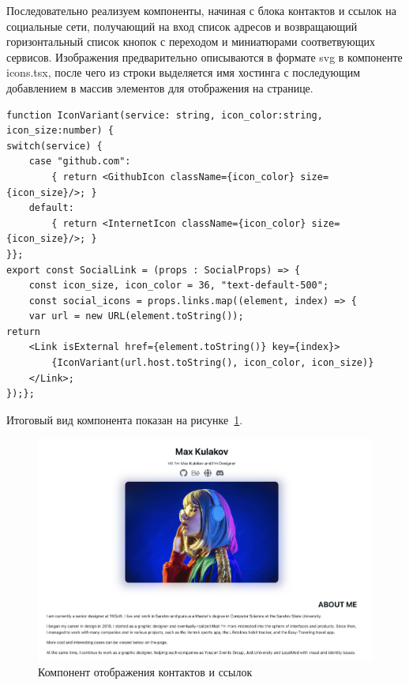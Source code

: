 \documentclass[master, och, pract]{SCWorks}
\begin{document}
Последовательно реализуем компоненты, начиная с блока контактов и ссылок на социальные сети, получающий на вход список адресов и возвращающий горизонтальный список кнопок с переходом и миниатюрами соответвующих сервисов. Изображения предварительно описываются в формате svg в компоненте icons.tsx, после чего из строки выделяется имя хостинга с последующим добавлением в массив элементов для отображения на странице.
\begin{verbatim}
function IconVariant(service: string, icon_color:string, icon_size:number) {
switch(service) { 
    case "github.com": 
        { return <GithubIcon className={icon_color} size={icon_size}/>; } 
    default: 
        { return <InternetIcon className={icon_color} size={icon_size}/>; }
}};
export const SocialLink = (props : SocialProps) => {
    const icon_size, icon_color = 36, "text-default-500";
    const social_icons = props.links.map((element, index) => {
    var url = new URL(element.toString());
return 	
    <Link isExternal href={element.toString()} key={index}>
        {IconVariant(url.host.toString(), icon_color, icon_size)}
    </Link>;
});};
\end{verbatim}

Итоговый вид компонента показан на рисунке~\ref{fig:2}. 
\begin{figure}[!ht]
    \centering
    \includegraphics[width=12cm]{images/image-resume-1.png}
    \caption{\label{fig:2}%
        Компонент отображения контактов и ссылок}
\end{figure}
\end{document}
